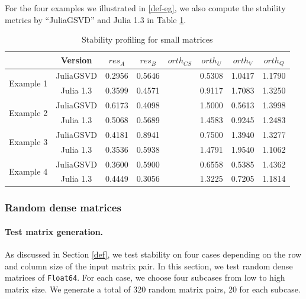     For the four examples we illustrated in \ref{def-eg}, we also compute the stability metrics by ``JuliaGSVD'' and Julia 1.3 in Table \ref{tab:sta_test_1}.
        \begin{table}[H]
        \centering
        \begin{tabular}{||c | c || c | c | c | c | c | c||} 
         \hline
         & Version & $res_A$ & $res_B$ & $orth_{CS}$ & $orth_U$ & $orth_V$ & $orth_Q$ \\ [0.5ex] 
         \hline\hline
         \multirow{2}{5em}{Example 1} & JuliaGSVD & 0.2956 & 0.5646 & & 0.5308 & 1.0417 & 1.1790 \\ 
         & Julia 1.3 & 0.3599 & 0.4571 & & 0.9117 & 1.7083 & 1.3250 \\
        \hline\hline
        \multirow{2}{5em}{Example 2} & JuliaGSVD & 0.6173 & 0.4098 & & 1.5000 & 0.5613 & 1.3998 \\ 
         & Julia 1.3 & 0.5068 & 0.5689 & & 1.4583 & 0.9245 & 1.2483 \\
        \hline\hline
        \multirow{2}{5em}{Example 3} & JuliaGSVD & 0.4181 & 0.8941 & & 0.7500 & 1.3940 & 1.3277 \\ 
         & Julia 1.3 & 0.3536 & 0.5938 & & 1.4791 & 1.9540 & 1.1062\\
        \hline\hline
        \multirow{2}{5em}{Example 4} & JuliaGSVD & 0.3600 & 0.5900 & & 0.6558 & 0.5385 & 1.4362 \\ 
         & Julia 1.3 & 0.4449 & 0.3056 & & 1.3225 & 0.7205 & 1.1814 \\
        \hline\hline
        \end{tabular}
        \caption{Stability profiling for small matrices}
        \label{tab:sta_test_1}
        \end{table}
        
    \subsubsection{Random dense matrices}
        \paragraph{Test matrix generation.} As discussed in Section \ref{def}, we test stability on four cases depending on the row and column size of the input matrix pair. In this section, we test random dense matrices of \texttt{Float64}. For each case, we choose four subcases from low to high matrix size. We generate a total of 320 random matrix pairs, 20 for each subcase.
        
